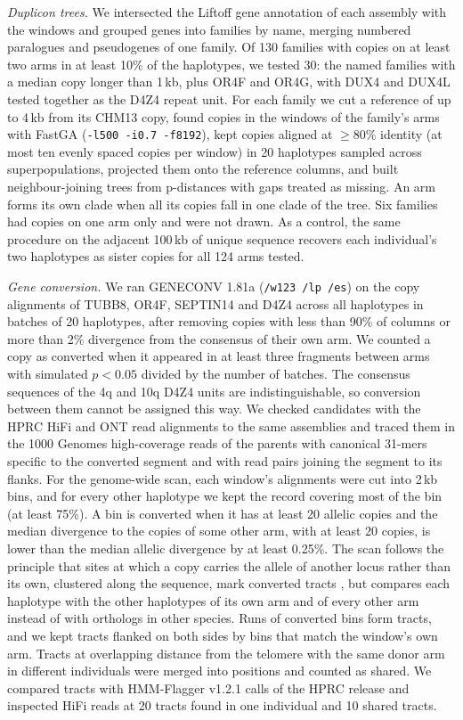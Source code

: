 \documentclass[pdflatex,mathphys]{jnl}
\begin{document}
\emph{Duplicon trees.} We intersected the Liftoff gene annotation of each assembly with the windows and
grouped genes into families by name, merging numbered paralogues and pseudogenes of one family. Of
130 families with copies on at least two arms in at least 10\% of the haplotypes, we tested 30: the
named families with a median copy longer than 1\,kb, plus OR4F and OR4G, with DUX4 and DUX4L tested
together as the D4Z4 repeat unit. For each family we cut a
reference of up to 4\,kb from its CHM13 copy, found copies in the windows of the family's arms with
FastGA (\texttt{-l500 -i0.7 -f8192}), kept copies aligned at $\geq 80$\% identity (at most ten evenly
spaced copies per window) in 20 haplotypes sampled across superpopulations, projected them onto the
reference columns, and built neighbour-joining trees from p-distances with gaps treated as missing.
An arm forms its own clade when all its copies fall in one clade of the tree. Six families had copies
on one arm only and were not drawn. As a control, the same procedure on the adjacent 100\,kb of unique
sequence recovers each individual's two haplotypes as sister copies for all 124 arms tested.

\emph{Gene conversion.} We ran GENECONV 1.81a \cite{Sawyer1989} (\texttt{/w123 /lp /es}) on the copy
alignments of TUBB8, OR4F, SEPTIN14 and D4Z4 across all haplotypes in batches of 20 haplotypes, after
removing copies with less than 90\% of columns or more than 2\% divergence from
the consensus of their own arm. We counted a copy as converted when it appeared in at least three
fragments between arms with simulated $p < 0.05$ divided by the number of batches. The consensus
sequences of the 4q and 10q D4Z4 units are indistinguishable, so conversion between them cannot be
assigned this way. We checked
candidates with the HPRC HiFi and ONT read alignments to the same assemblies and traced them in the
1000 Genomes high-coverage reads of the parents with canonical 31-mers specific to the converted
segment and with read pairs joining the segment to its flanks. For the genome-wide scan, each window's
alignments were cut into 2\,kb bins, and for every other haplotype we kept the record covering most of
the bin (at least 75\%). A bin is converted when it has at least 20 allelic copies and the median
divergence to the copies of some other arm, with at least 20 copies, is lower than the median allelic
divergence by at least 0.25\%. The scan follows the principle that sites at which a copy carries the
allele of another locus rather than its own, clustered along the sequence, mark converted tracts
\cite{Harpak2017}, but compares each haplotype with the other haplotypes of its own arm and of every
other arm instead of with orthologs in other species. Runs of converted bins form tracts, and we kept tracts flanked on both
sides by bins that match the window's own arm. Tracts at overlapping distance from the telomere with
the same donor arm in different individuals were merged into positions and counted as shared. We
compared tracts with HMM-Flagger v1.2.1 calls of the HPRC release and inspected HiFi reads at 20
tracts found in one individual and 10 shared tracts.
\end{document}
